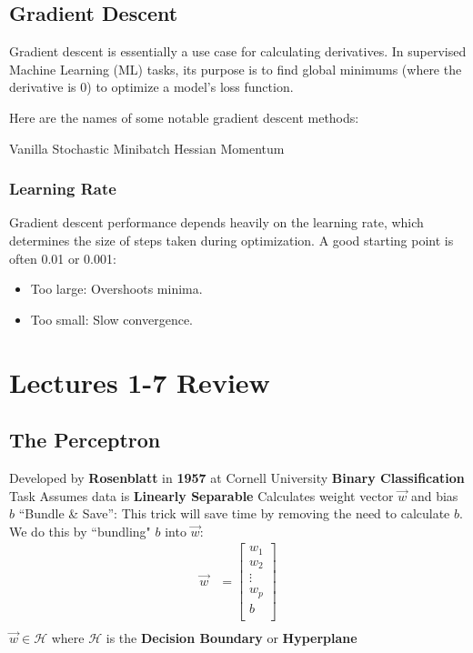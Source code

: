 \subsection{Gradient Descent}
Gradient descent \cite{goodfellow2016deep} is essentially a use case for calculating derivatives. In supervised Machine Learning (ML) tasks, its purpose is to find global minimums (where the derivative is 0) to optimize a model's loss function. 


Here are the names of some notable gradient descent methods:
\begin{outline}
    \1 Vanilla
    \1 Stochastic
    \1 Minibatch
    \1 Hessian
    \1 Momentum

\end{outline}
\subsubsection{Learning Rate}
Gradient descent performance depends heavily on the learning rate, which determines the size of steps taken during optimization. A good starting point is often 0.01 or 0.001:
\begin{itemize}
    \item Too large: Overshoots minima.
    \item Too small: Slow convergence.
\end{itemize}
\section{Lectures 1-7 Review}

\subsection{The Perceptron\cite{rosenblatt1958perceptron}}
\begin{outline}
    \1 Developed by \textbf{Rosenblatt} in \textbf{1957} at Cornell University
    \1 \textbf{Binary Classification} Task
    \1 Assumes data is \textbf{Linearly Separable}
    \1 Calculates weight vector $\vec{w}$ and bias $b$ 
    \1 ``Bundle \& Save'': This trick will save time by removing the need to calculate $b$. We do this by ``bundling" $b$ into $\vec{w}$: 
    \begin{align*}
    \vec{w} &= \begin{bmatrix}
           w_{1}    \\
           w_{2}    \\
           \vdots   \\
           w_{p}    \\
           b        \\
         \end{bmatrix} \\
    \end{align*}
    \1 $\vec{w} \in \mathcal{H}$ where $\mathcal{H}$ is the \textbf{Decision Boundary} or \textbf{Hyperplane}
    
\end{outline}

